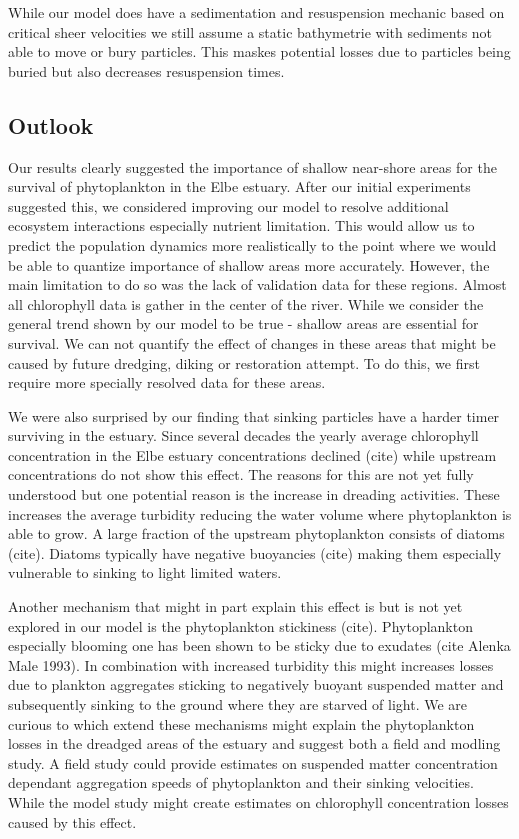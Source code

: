 While our model does have a sedimentation and resuspension mechanic based on critical sheer velocities we still assume a static bathymetrie with sediments not able to move or bury particles. 
This maskes potential losses due to particles being buried but also decreases resuspension times.

\subsection*{Outlook}

Our results clearly suggested the importance of shallow near-shore areas for the survival of phytoplankton in the Elbe estuary.
After our initial experiments suggested this, we considered improving our model to resolve additional ecosystem interactions especially nutrient limitation.
This would allow us to predict the population dynamics more realistically to the point where we would be able to quantize importance of shallow areas more accurately.
However, the main limitation to do so was the lack of validation data for these regions. 
Almost all chlorophyll data is gather in the center of the river.
While we consider the general trend shown by our model to be true - shallow areas are essential for survival. We can not quantify the effect of changes in these areas that might be caused by future dredging, diking or restoration attempt.
To do this, we first require more specially resolved data for these areas.

We were also surprised by our finding that sinking particles have a harder timer surviving in the estuary. 
Since several decades the yearly average chlorophyll concentration in the Elbe estuary concentrations declined (cite) while upstream concentrations do not show this effect.
The reasons for this are not yet fully understood but one potential reason is the increase in dreading activities.
These increases the average turbidity reducing the water volume where phytoplankton is able to grow.
A large fraction of the upstream phytoplankton consists of diatoms (cite).
Diatoms typically have negative buoyancies (cite) making them especially vulnerable to sinking to light limited waters.

Another mechanism that might in part explain this effect is but is not yet explored in our model is the phytoplankton stickiness (cite). 
Phytoplankton especially blooming one has been shown to be sticky due to exudates (cite Alenka Male 1993).
In combination with increased turbidity this might increases losses due to plankton aggregates sticking to negatively buoyant suspended matter and subsequently sinking to the ground where they are starved of light.
We are curious to which extend these mechanisms might explain the phytoplankton losses in the dreadged areas of the estuary and suggest both a field and modling study. A field study could provide estimates on suspended matter concentration dependant aggregation speeds of phytoplankton and their sinking velocities. While the model study might create estimates on chlorophyll concentration losses caused by this effect.


